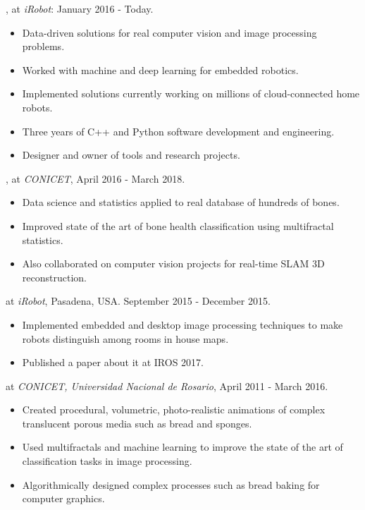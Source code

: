 \documentclass[a4paper,10pt]{article}
\begin{document}
, at {\em iRobot}: January 2016 - Today.
\begin{itemize}
\item Data-driven solutions for real computer vision and image processing problems.
\item Worked with machine and deep learning for embedded robotics.
\item Implemented solutions currently working on millions of cloud-connected home robots.
\item Three years of C++ and Python software development and engineering.
\item Designer and owner of tools and research projects.
\end{itemize}

, at {\em CONICET}, April 2016 - March 2018.
\begin{itemize}
\item Data science and statistics applied to real database of hundreds of bones.
\item Improved state of the art of bone health classification using multifractal statistics.
\item Also collaborated on computer vision projects for real-time SLAM 3D reconstruction.
\end{itemize}

 at {\em iRobot}, Pasadena, USA. September 2015 - December 2015.
\begin{itemize}
\item Implemented embedded and desktop image processing techniques to make robots distinguish among rooms in house maps.
\item Published a paper about it at IROS 2017.
\end{itemize}

 at {\em CONICET, Universidad Nacional de Rosario}, April 2011 - March 2016.
\begin{itemize}
\item Created procedural, volumetric, photo-realistic animations of complex translucent porous media such as bread and sponges.
\item Used multifractals and machine learning to improve the state of the art of classification tasks in image processing.
\item Algorithmically designed complex processes such as bread baking for computer graphics.
\end{itemize}
\end{document}
